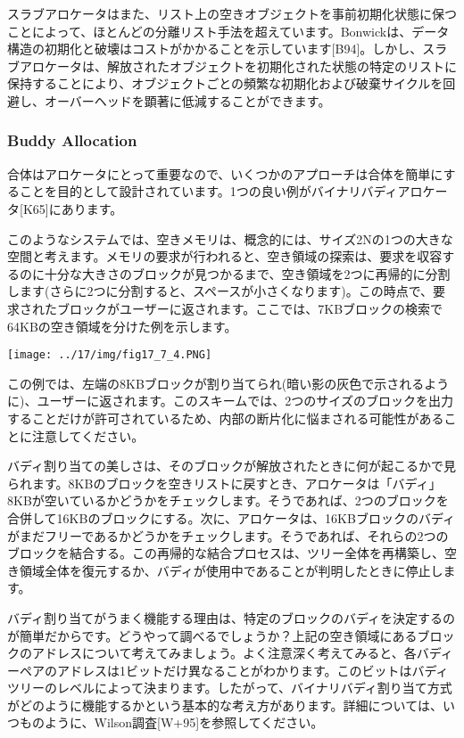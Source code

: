 スラブアロケータはまた、リスト上の空きオブジェクトを事前初期化状態に保つことによって、ほとんどの分離リスト手法を超えています。Bonwickは、データ構造の初期化と破壊はコストがかかることを示しています{[}B94{]}。しかし、スラブアロケータは、解放されたオブジェクトを初期化された状態の特定のリストに保持することにより、オブジェクトごとの頻繁な初期化および破棄サイクルを回避し、オーバーヘッドを顕著に低減することができます。

\hypertarget{buddy-allocation}{%
\subsubsection*{Buddy Allocation}\label{buddy-allocation}}

合体はアロケータにとって重要なので、いくつかのアプローチは合体を簡単にすることを目的として設計されています。1つの良い例がバイナリバディアロケータ{[}K65{]}にあります。

このようなシステムでは、空きメモリは、概念的には、サイズ2Nの1つの大きな空間と考えます。メモリの要求が行われると、空き領域の探索は、要求を収容するのに十分な大きさのブロックが見つかるまで、空き領域を2つに再帰的に分割します(さらに2つに分割すると、スペースが小さくなります)。この時点で、要求されたブロックがユーザーに返されます。ここでは、7KBブロックの検索で64KBの空き領域を分けた例を示します。

\texttt{[image: ../17/img/fig17\_7\_4.PNG]}

この例では、左端の8KBブロックが割り当てられ(暗い影の灰色で示されるように)、ユーザーに返されます。このスキームでは、2つのサイズのブロックを出力することだけが許可されているため、内部の断片化に悩まされる可能性があることに注意してください。

バディ割り当ての美しさは、そのブロックが解放されたときに何が起こるかで見られます。8KBのブロックを空きリストに戻すとき、アロケータは「バディ」8KBが空いているかどうかをチェックします。そうであれば、2つのブロックを合併して16KBのブロックにする。次に、アロケータは、16KBブロックのバディがまだフリーであるかどうかをチェックします。そうであれば、それらの2つのブロックを結合する。この再帰的な結合プロセスは、ツリー全体を再構築し、空き領域全体を復元するか、バディが使用中であることが判明したときに停止します。

バディ割り当てがうまく機能する理由は、特定のブロックのバディを決定するのが簡単だからです。どうやって調べるでしょうか？上記の空き領域にあるブロックのアドレスについて考えてみましょう。よく注意深く考えてみると、各バディーペアのアドレスは1ビットだけ異なることがわかります。このビットはバディツリーのレベルによって決まります。したがって、バイナリバディ割り当て方式がどのように機能するかという基本的な考え方があります。詳細については、いつものように、Wilson調査{[}W+95{]}を参照してください。

